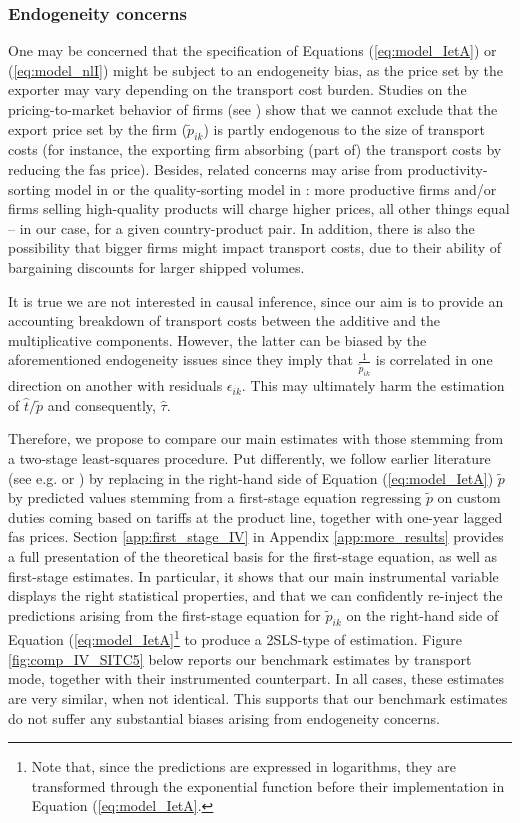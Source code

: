 \documentclass[a4paper,11pt]{article}
\begin{document}
\subsubsection{Endogeneity concerns} One may be concerned that the specification of Equations (\ref{eq:model_IetA}) or (\ref{eq:model_nlI}) might be subject to an endogeneity bias, as the price set by the exporter may vary depending on the transport cost burden. Studies on the pricing-to-market behavior of firms (see \citealp{Krugman-87}) show that we cannot exclude that the export price set by the firm ($\widetilde{p}_{ik}$) is partly endogenous to the size of transport costs (for instance, the exporting firm absorbing (part of) the transport costs by reducing the fas price).
Besides, related concerns may arise from productivity-sorting model in \cite{melitz} or the quality-sorting model in \cite{baldwin_harrigan}: more productive firms and/or firms selling high-quality products will charge higher prices, all other things equal – in our case, for a given country-product pair. In addition, there is also the possibility that bigger firms might impact transport costs, due to their ability of bargaining discounts for larger shipped volumes.

It is true we are not interested in causal inference, since our aim is to provide an accounting breakdown of transport costs between the additive and the multiplicative components. However, the latter can be biased by the aforementioned endogeneity issues since they imply that $\frac{1}{\widetilde{p}_{ik}}$ is correlated in one direction on another with residuals $\epsilon_{ik}$. This may ultimately harm the estimation of $\widehat{t}/\widetilde{p}$ and consequently, $\widehat{\tau}$.

Therefore, we propose to compare our main estimates with those stemming from a two-stage least-squares procedure. Put differently, we follow earlier literature (see e.g. \citealp{Caliendo_Parro_2015} or \citealp{Lashkaripour-2017}) by replacing in the right-hand side of Equation (\ref{eq:model_IetA}) $\widetilde{p}$ by predicted values stemming from a first-stage equation regressing $\widetilde{p}$ on custom duties coming based on tariffs at the product line, together with one-year lagged fas prices. Section \ref{app:first_stage_IV} in Appendix \ref{app:more_results} provides a full presentation of the theoretical basis for the first-stage equation, as well as first-stage estimates. In particular, it shows that our main instrumental variable displays the right statistical properties, and that we can confidently re-inject the predictions arising from the first-stage equation for $\widetilde{p}_{ik}$ on the right-hand side of Equation (\ref{eq:model_IetA}\footnote{Note that, since the predictions are expressed in logarithms, they are transformed through the exponential function before their implementation in Equation (\ref{eq:model_IetA}.} to produce a 2SLS-type of estimation. Figure \ref{fig:comp_IV_SITC5} below reports our benchmark estimates by transport mode, together with their instrumented counterpart. In all cases, these estimates are very similar, when not identical. This supports that our benchmark estimates do not suffer any substantial biases arising from endogeneity concerns.
\end{document}
